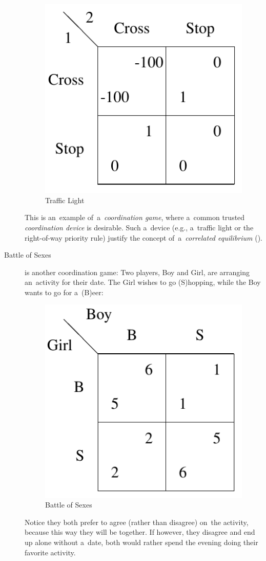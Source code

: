 \begin{description}
    \begin{figure}[H]
      \centering
      \includegraphics[width=.23\paperwidth]{../img/traffic-light.png}
      \caption{Traffic Light}
      \label{fig:traffic-light}
    \end{figure}

    This is an~example of~a~\emph{coordination game}, where a~common trusted \emph{coordination device} is desirable.
    Such a~device (e.g., a~traffic light or the right-of-way priority rule) justify the concept of~a~\emph{correlated equilibrium} (\cite[Subsection~1.3.6]{AGT07}).

  \item [Battle of Sexes] is another coordination game:
    Two players, Boy and Girl, are arranging an~activity for their date.
    The Girl wishes to go (S)hopping, while the Boy wants to go for a~(B)eer:
    \begin{figure}[H]
      \centering
      \includegraphics[width=.23\paperwidth]{../img/battle-of-sexes.png}
      \caption{Battle of Sexes}
      \label{fig:battle-of-sexes}
    \end{figure}
    Notice they both prefer to agree (rather than disagree) on~the activity, because this way they will be together.
    If however, they disagree and end up alone without a~date, both would rather spend the evening doing their favorite activity.
\end{description}

